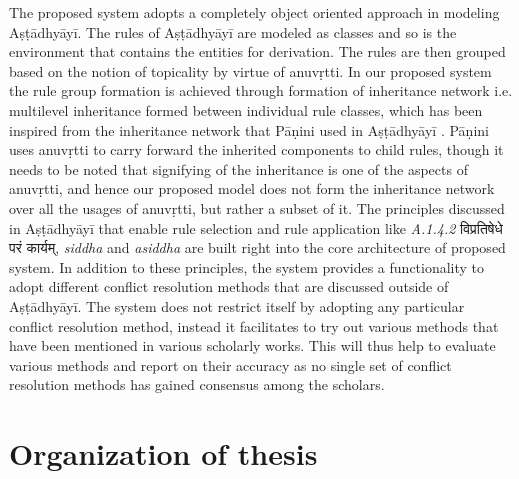 \documentclass[a4paper,11pt,twoside,openright]{report}
\begin{document}
The proposed system adopts a completely object oriented approach in modeling Aṣṭādhyāyī. The rules of Aṣṭādhyāyī are modeled as classes and so is the environment that contains the entities for derivation. The rules are then grouped based on the notion of topicality by virtue of anuvṛtti. In our proposed system the rule group formation is achieved through formation of inheritance network i.e. multilevel inheritance formed between individual rule classes, which has been inspired from the inheritance network that Pāṇini used in Aṣṭādhyāyī \cite{deo07}. Pāṇini uses anuvṛtti to carry forward the inherited components to child rules, though it needs to be noted that signifying of the inheritance is one of the aspects of anuvṛtti, and hence our proposed model does not form the inheritance network over all the usages of anuvṛtti, but rather a subset of it. The principles discussed in Aṣṭādhyāyī that enable rule selection and rule application like \textsl{ A.1.4.2} {\skt विप्रतिषेधे परं कार्यम्}, \textsl{ siddha} and \textsl{ asiddha} are built right into the core architecture of proposed system. In addition to these principles, the system provides a functionality to adopt different conflict resolution methods that are discussed outside of Aṣṭādhyāyī. The system does not restrict itself by adopting any particular conflict resolution method, instead it facilitates to try out various methods that have been mentioned in various scholarly works. This will thus help to evaluate various methods and report on their accuracy as no single set of conflict resolution methods has gained consensus among the scholars.

\section{Organization of thesis}
\end{document}
